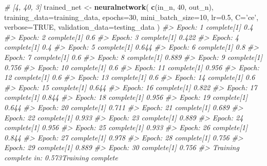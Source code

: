 \documentclass[]{book}
\newenvironment{Shaded}{\begin{snugshade}}{\end{snugshade}}
\newcommand{\CommentTok}[1]{\textcolor[rgb]{0.56,0.35,0.01}{\textit{#1}}}
\newcommand{\DataTypeTok}[1]{\textcolor[rgb]{0.13,0.29,0.53}{#1}}
\newcommand{\DecValTok}[1]{\textcolor[rgb]{0.00,0.00,0.81}{#1}}
\newcommand{\FloatTok}[1]{\textcolor[rgb]{0.00,0.00,0.81}{#1}}
\newcommand{\KeywordTok}[1]{\textcolor[rgb]{0.13,0.29,0.53}{\textbf{#1}}}
\newcommand{\NormalTok}[1]{#1}
\newcommand{\OperatorTok}[1]{\textcolor[rgb]{0.81,0.36,0.00}{\textbf{#1}}}
\newcommand{\OtherTok}[1]{\textcolor[rgb]{0.56,0.35,0.01}{#1}}
\newcommand{\StringTok}[1]{\textcolor[rgb]{0.31,0.60,0.02}{#1}}
\begin{document}
\begin{Shaded}
\begin{Highlighting}[]
\CommentTok{# [4, 40, 3] }
\NormalTok{trained_net <-}\StringTok{ }\KeywordTok{neuralnetwork}\NormalTok{(}
    \KeywordTok{c}\NormalTok{(in_n, }\DecValTok{40}\NormalTok{, out_n),}
    \DataTypeTok{training_data=}\NormalTok{training_data,}
    \DataTypeTok{epochs=}\DecValTok{30}\NormalTok{, }
    \DataTypeTok{mini_batch_size=}\DecValTok{10}\NormalTok{,}
    \DataTypeTok{lr=}\FloatTok{0.5}\NormalTok{,}
    \DataTypeTok{C=}\StringTok{'ce'}\NormalTok{,}
    \DataTypeTok{verbose=}\OtherTok{TRUE}\NormalTok{,}
    \DataTypeTok{validation_data=}\NormalTok{testing_data}
\NormalTok{)}
\CommentTok{#> Epoch:  1  complete[1] 0.4}
\CommentTok{#> Epoch:  2  complete[1] 0.6}
\CommentTok{#> Epoch:  3  complete[1] 0.422}
\CommentTok{#> Epoch:  4  complete[1] 0.4}
\CommentTok{#> Epoch:  5  complete[1] 0.644}
\CommentTok{#> Epoch:  6  complete[1] 0.8}
\CommentTok{#> Epoch:  7  complete[1] 0.6}
\CommentTok{#> Epoch:  8  complete[1] 0.889}
\CommentTok{#> Epoch:  9  complete[1] 0.756}
\CommentTok{#> Epoch:  10  complete[1] 0.6}
\CommentTok{#> Epoch:  11  complete[1] 0.956}
\CommentTok{#> Epoch:  12  complete[1] 0.6}
\CommentTok{#> Epoch:  13  complete[1] 0.6}
\CommentTok{#> Epoch:  14  complete[1] 0.6}
\CommentTok{#> Epoch:  15  complete[1] 0.644}
\CommentTok{#> Epoch:  16  complete[1] 0.822}
\CommentTok{#> Epoch:  17  complete[1] 0.844}
\CommentTok{#> Epoch:  18  complete[1] 0.956}
\CommentTok{#> Epoch:  19  complete[1] 0.644}
\CommentTok{#> Epoch:  20  complete[1] 0.711}
\CommentTok{#> Epoch:  21  complete[1] 0.689}
\CommentTok{#> Epoch:  22  complete[1] 0.933}
\CommentTok{#> Epoch:  23  complete[1] 0.889}
\CommentTok{#> Epoch:  24  complete[1] 0.956}
\CommentTok{#> Epoch:  25  complete[1] 0.933}
\CommentTok{#> Epoch:  26  complete[1] 0.844}
\CommentTok{#> Epoch:  27  complete[1] 0.978}
\CommentTok{#> Epoch:  28  complete[1] 0.756}
\CommentTok{#> Epoch:  29  complete[1] 0.889}
\CommentTok{#> Epoch:  30  complete[1] 0.756}
\CommentTok{#> Training complete in:  0.573Training complete}
\end{Highlighting}
\end{Shaded}

\begin{Shaded}
\end{Shaded}
\end{document}
